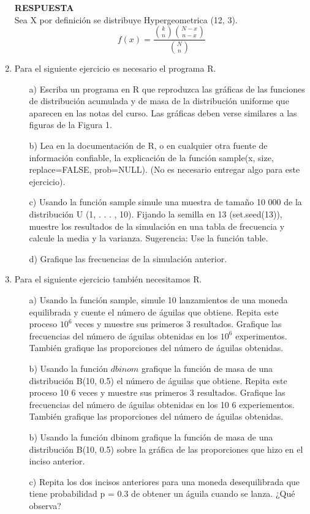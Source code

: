\documentclass[11pt,letterpaper]{article}
\newcommand{\res}{\textbf{RESPUESTA}\\}
\begin{document}
\begin{enumerate}
\res 

Sea X por definición se distribuye Hypergeometrica (12, 3).
\begin{equation*}
f(x)= \frac{{k\choose n}{N-x\choose n-x}}{{N\choose n}}
\end{equation*}

\item Para el siguiente ejercicio es necesario el programa \textsc{R}.
\begin{itemize}
\item[a)] Escriba un programa en \textsc{R}  que reproduzca las gráficas de las funciones de distribución
acumulada y de masa de la distribución uniforme que aparecen en las notas del curso. Las gráficas deben verse similares a las figuras de la Figura 1.

\item[b)] Lea en la documentación de \textsc{R}, o en cualquier otra fuente de información confiable,
la explicación de la función sample(x, size, replace=FALSE, prob=NULL). (No es necesario entregar algo para este ejercicio).

\item[c)] Usando la función sample simule una muestra de tamaño 10 000 de la distribución
U (1, . . . , 10). Fijando la semilla en 13 (set.seed(13)), muestre los resultados de la
simulación en una tabla de frecuencia y calcule la media y la varianza. Sugerencia: Use la función table.
\item[d)] Grafique las frecuencias de la simulación anterior.
\end{itemize}


\item Para el siguiente ejercicio también necesitamos R.


\begin{itemize}
\item[a)] Usando la función sample, simule 10 lanzamientos de una moneda equilibrada y cuente el número de águilas que obtiene. Repita este proceso $10^6$ veces y muestre sus primeros 3 resultados. Grafique las frecuencias del número de águilas obtenidas en los $10^6$ experimentos. También grafique las proporciones del número de águilas obtenidas.
\item[b)] Usando la función $dbinom$ grafique la función de masa de una distribución B(10, 0.5) el número de águilas que obtiene. Repita este proceso 10 6 veces y muestre sus primeros 3 resultados. Grafique las frecuencias del número de águilas obtenidas en los 10 6
experiementos. También grafique las proporciones del número de águilas obtenidas.
\item[b)] Usando la función dbinom grafique la función de masa de una distribución B(10, 0.5) sobre la gráfica de las proporciones que hizo en el inciso anterior.
\item[c)] Repita los dos incisos anteriores para una moneda desequilibrada que tiene probabilidad
p = 0.3 de obtener un águila cuando se lanza. ¿Qué observa?
\end{itemize}


\end{enumerate}
\end{document}
